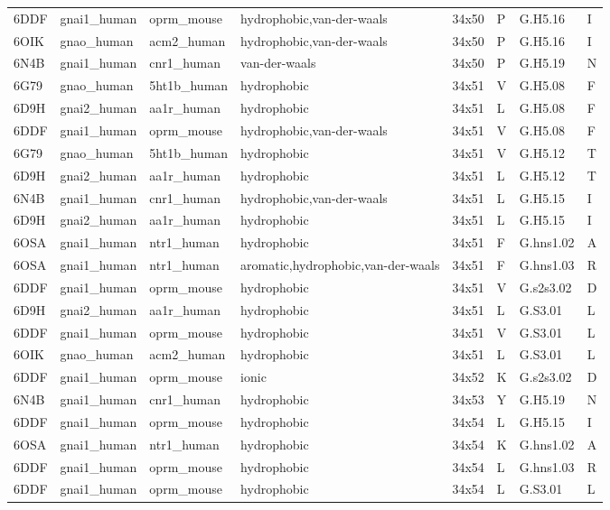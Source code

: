 \begin{landscape}
\begin{longtable}{llllllll}
6DDF & gnai1\_human & oprm\_mouse & hydrophobic,van-der-waals & 34x50 & P & G.H5.16 & I\\
6OIK & gnao\_human & acm2\_human & hydrophobic,van-der-waals & 34x50 & P & G.H5.16 & I\\
6N4B & gnai1\_human & cnr1\_human & van-der-waals & 34x50 & P & G.H5.19 & N\\
6G79 & gnao\_human & 5ht1b\_human & hydrophobic & 34x51 & V & G.H5.08 & F\\
\addlinespace
6D9H & gnai2\_human & aa1r\_human & hydrophobic & 34x51 & L & G.H5.08 & F\\
6DDF & gnai1\_human & oprm\_mouse & hydrophobic,van-der-waals & 34x51 & V & G.H5.08 & F\\
6G79 & gnao\_human & 5ht1b\_human & hydrophobic & 34x51 & V & G.H5.12 & T\\
6D9H & gnai2\_human & aa1r\_human & hydrophobic & 34x51 & L & G.H5.12 & T\\
6N4B & gnai1\_human & cnr1\_human & hydrophobic,van-der-waals & 34x51 & L & G.H5.15 & I\\
\addlinespace
6D9H & gnai2\_human & aa1r\_human & hydrophobic & 34x51 & L & G.H5.15 & I\\
6OSA & gnai1\_human & ntr1\_human & hydrophobic & 34x51 & F & G.hns1.02 & A\\
6OSA & gnai1\_human & ntr1\_human & aromatic,hydrophobic,van-der-waals & 34x51 & F & G.hns1.03 & R\\
6DDF & gnai1\_human & oprm\_mouse & hydrophobic & 34x51 & V & G.s2s3.02 & D\\
6D9H & gnai2\_human & aa1r\_human & hydrophobic & 34x51 & L & G.S3.01 & L\\
\addlinespace
6DDF & gnai1\_human & oprm\_mouse & hydrophobic & 34x51 & V & G.S3.01 & L\\
6OIK & gnao\_human & acm2\_human & hydrophobic & 34x51 & L & G.S3.01 & L\\
6DDF & gnai1\_human & oprm\_mouse & ionic & 34x52 & K & G.s2s3.02 & D\\
6N4B & gnai1\_human & cnr1\_human & hydrophobic & 34x53 & Y & G.H5.19 & N\\
6DDF & gnai1\_human & oprm\_mouse & hydrophobic & 34x54 & L & G.H5.15 & I\\
\addlinespace
6OSA & gnai1\_human & ntr1\_human & hydrophobic & 34x54 & K & G.hns1.02 & A\\
6DDF & gnai1\_human & oprm\_mouse & hydrophobic & 34x54 & L & G.hns1.03 & R\\
6DDF & gnai1\_human & oprm\_mouse & hydrophobic & 34x54 & L & G.S3.01 & L\\

\end{longtable}
\end{landscape}
